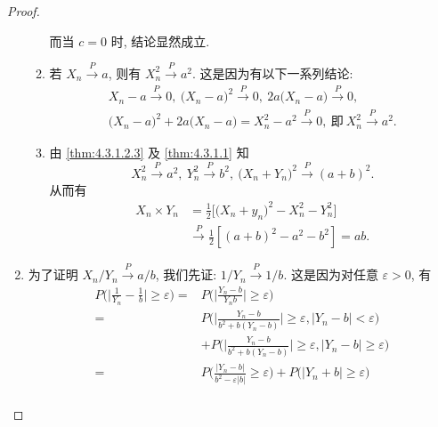 \begin{proof}
\begin{enumerate}
\begin{enumerate}
            而当 $ c = 0$ 时, 结论显然成立.
            \item\label{thm:4.3.1.2.3} 若 $ X_n \stackrel{P}{\to} a $, 则有 $ X_n^2 \stackrel{P}{\to} a^2 $.
            这是因为有以下一系列结论:
            \begin{gather*}
                X_n - a \stackrel{P}{\to} 0, \ \bigl( X_n - a \bigr)^2 \stackrel{P}{\to} 0, \ 2a \bigl( X_n - a \bigr) \stackrel{P}{\to} 0,\\
                \bigl( X_n - a \bigr)^2 + 2a \bigl( X_n - a \bigr) = X_n^2 - a^2 \stackrel{P}{\to} 0, \ \text{即} \ X_n^2 \stackrel{P}{\to} a^2.
            \end{gather*}
            \item 由 \ref{thm:4.3.1.2.3} 及 \ref{thm:4.3.1.1} 知
            \begin{equation*}
                X_n^2 \stackrel{P}{\to} a^2, \ Y_n^2 \stackrel{P}{\to} b^2, \ \bigl( X_n + Y_n \bigr)^2 \stackrel{P}{\to} ( a + b )^2.
            \end{equation*}
            从而有
            \begin{align*}
                X_n \times Y_n & = \frac{1}{2} \bigl[ \bigl( X_n + y_n \bigr)^2 - X_n^2 - Y_n^2 \bigr]\\
                & \stackrel{P}{\to} \frac{1}{2} [ ( a + b )^2 - a^2 - b^2 ] = ab.
            \end{align*}
        \end{enumerate}
        \item 为了证明 $ X_n / Y_n \stackrel{P}{\to} a/b $, 我们先证: $ 1 / Y_n \stackrel{P}{\to} 1 / b $.
        这是因为对任意 $ \varepsilon > 0 $, 有
        \begin{align*}
            P \biggl( \biggl\lvert \frac{1}{Y_n} - \frac{1}{b} \biggr\rvert \geq \varepsilon \biggr)
            ={} & P \biggl( \biggl\lvert \frac{Y_n - b}{Y_n b} \biggr\rvert \geq \varepsilon \biggr)\\
            ={} & P \biggl( \biggl\lvert \frac{Y_n - b}{b^2 + b ( Y_n - b )} \biggr\rvert \geq \varepsilon, \bigl\lvert Y_n - b \bigr\rvert < \varepsilon \biggr)\\
            & + P \biggl( \biggl\lvert \frac{Y_n - b}{b^2 + b ( Y_n - b )} \biggr\rvert \geq \varepsilon, \bigl\lvert Y_n - b \bigr\rvert \geq \varepsilon \biggr)\\
            ={} & P \biggl( \frac{\lvert Y_n - b \rvert}{b^2 - \varepsilon \lvert b \rvert} \geq \varepsilon \biggr)
            + P \bigl( \bigl\lvert Y_n + b \bigr\rvert \geq \varepsilon \bigr)\\

\end{align*}
\end{enumerate}
\end{proof}
